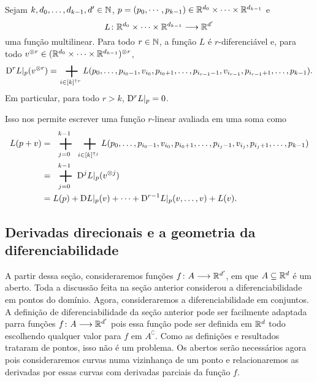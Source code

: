 \begin{exercise}
Sejam $k,d_0,\ldots,d_{k-1},d' \in \mathbb{N}$, $p=(p_0,\cdots,p_{k-1}) \in \mathbb{R}^{d_0} \times \cdots \times \mathbb{R}^{d_{k-1}}$ e
	\begin{equation*}
	{L}\colon {\mathbb{R}^{d_0} \times \cdots \times \mathbb{R}^{d_{k-1}}} \longrightarrow {\mathbb{R}^{d'}}
	\end{equation*}
uma função multilinear. Para todo $r \in \mathbb{N}$, a função $L$ é $r$-diferenciável e, para todo $v^{\otimes r} \in (\mathbb{R}^{d_0} \times \cdots \times \mathbb{R}^{d_{k-1}})^{\otimes r}$,
	\begin{equation*}
	\D^r L|_p (v^{\otimes r}) = \sum_{i \in [k]^{\uparrow r}} L(p_0,\ldots,p_{i_0-1},v_{i_0},p_{i_0+1},\ldots,p_{i_{r-1}-1},v_{i_{r-1}},p_{i_{r-1}+1},\ldots,p_{k-1}).
	\end{equation*}
Em particular, para todo $r > k$, $\mathrm{D}^r L|_p = 0$.
\end{exercise}

Isso nos permite escrever uma função $r$-linear avaliada em uma soma como
	\begin{align*}
	L(p+v) &= \sum_{j=0}^{k-1} \sum_{i \in [k]^{\uparrow j}} L(p_0,\ldots,p_{i_0-1},v_{i_0},p_{i_0+1},\ldots,p_{i_j-1},v_{i_j},p_{i_j+1},\ldots,p_{k-1}) \\
		&= \sum_{j=0}^{k-1} \D^j L|_p (v^{\otimes j}) \\
		&= L(p) + \D L|_p (v) + \cdots + \D^{r-1} L|_p (v,\ldots,v) + L(v).
	\end{align*}



\subsection{Derivadas direcionais e a geometria da diferenciabilidade}

A partir dessa seção, consideraremos funções ${f}\colon {A} \longrightarrow {\mathbb{R}^{d'}}$, em que $A \subseteq \mathbb{R}^d$ é um aberto. Toda a discussão feita na seção anterior considerou a diferenciabilidade em pontos do domínio. Agora, consideraremos a diferenciabilidade em conjuntos. A definição de diferenciabilidade da seção anterior pode ser facilmente adaptada parra funções ${f}\colon {A} \longrightarrow {\mathbb{R}^{d'}}$ pois essa função pode ser definida em $\mathbb{R}^d$ todo escolhendo qualquer valor para $f$ em $A^\complement$. Como as definições e resultados trataram de pontos, isso não é um problema. Os abertos serão necessários agora pois consideraremos curvas numa vizinhança de um ponto e relacionaremos as derivadas por essas curvas com derivadas parciais da função $f$.

